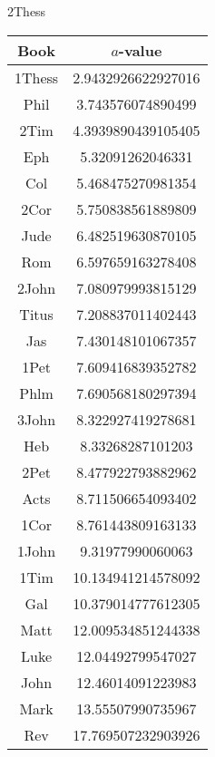 \documentclass[12pt,letterpaper]{article}
\begin{document}
2Thess
\begin{longtable}{|c|c|}
\hline
 Book & $a$-value \\ \hline
1Thess & 2.9432926622927016 \\ \hline
 Phil & 3.743576074890499 \\ \hline
 2Tim & 4.3939890439105405 \\ \hline
 Eph & 5.32091262046331 \\ \hline
 Col & 5.468475270981354 \\ \hline
 2Cor & 5.750838561889809 \\ \hline
 Jude & 6.482519630870105 \\ \hline
 Rom & 6.597659163278408 \\ \hline
 2John & 7.080979993815129 \\ \hline
 Titus & 7.208837011402443 \\ \hline
 Jas & 7.430148101067357 \\ \hline
 1Pet & 7.609416839352782 \\ \hline
 Phlm & 7.690568180297394 \\ \hline
 3John & 8.322927419278681 \\ \hline
 Heb & 8.33268287101203 \\ \hline
 2Pet & 8.477922793882962 \\ \hline
 Acts & 8.711506654093402 \\ \hline
 1Cor & 8.761443809163133 \\ \hline
 1John & 9.31977990060063 \\ \hline
 1Tim & 10.134941214578092 \\ \hline
 Gal & 10.379014777612305 \\ \hline
 Matt & 12.009534851244338 \\ \hline
 Luke & 12.04492799547027 \\ \hline
 John & 12.46014091223983 \\ \hline
 Mark & 13.55507990735967 \\ \hline
 Rev & 17.769507232903926 \\ \hline 
\end{longtable}
\end{document}
